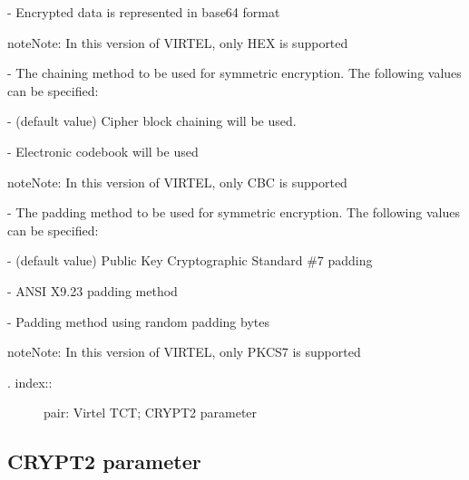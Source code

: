 \documentclass[letterpaper,10pt,english]{sphinxmanual}
\begin{document}
 - Encrypted data is represented in base64 format

\begin{sphinxadmonition}{note}{Note:}
In this version of VIRTEL, only HEX is supported
\end{sphinxadmonition}

 - The chaining method to be used for symmetric encryption. The following values can be specified:

 - (default value) Cipher block chaining will be used.

 - Electronic codebook will be used

\begin{sphinxadmonition}{note}{Note:}
In this version of VIRTEL, only CBC is supported
\end{sphinxadmonition}

 - The padding method to be used for symmetric encryption. The following values can be specified:

 - (default value) Public Key Cryptographic Standard \#7 padding

 - ANSI X9.23 padding method

 - Padding method using random padding bytes

\begin{sphinxadmonition}{note}{Note:}
In this version of VIRTEL, only PKCS7 is supported
\end{sphinxadmonition}
\begin{description}
\item[{. index::}] \leavevmode
pair: Virtel TCT; CRYPT2 parameter

\end{description}


\subsection{CRYPT2 parameter}
\label{\detokenize{Installation_Guide:crypt2-parameter}}
\begin{sphinxVerbatim}[commandchars=\\\{\}]
\PYG{p}{[}\PYG{p}{]}\PYG{p}{[}\PYG{p}{]}\PYG{p}{[}\PYG{p}{]}\PYG{p}{[}\PYG{p}{]}\PYG{p}{[}\PYG{p}{]}\PYG{p}{[}\PYG{p}{]}
\end{sphinxVerbatim}
\end{document}
